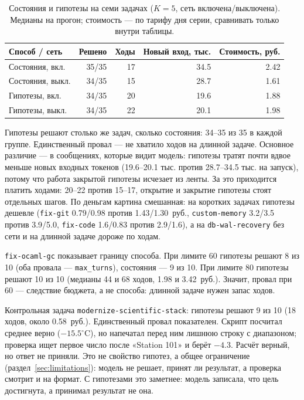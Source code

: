 \documentclass[11pt,a4paper]{article}
\begin{document}
\begin{table}[t]
\centering
\small
\caption{Состояния и гипотезы на семи задачах ($K=5$, сеть включена/выключена). Медианы на
прогон; стоимость --- по тарифу дня серии, сравнивать только внутри таблицы.}
\label{tab:hyp}
\begin{tabular}{@{}lrrrr@{}}
\toprule
Способ / сеть & Решено & Ходы & Новый вход, тыс. & Стоимость, руб. \\
\midrule
Состояния, вкл. & 35/35 & 17 & 34.5 & 2.42 \\
Состояния, выкл. & 34/35 & 15 & 28.7 & 1.61 \\
Гипотезы, вкл. & 34/35 & 20 & 19.6 & 1.88 \\
Гипотезы, выкл. & 34/35 & 22 & 20.1 & 1.98 \\
\bottomrule
\end{tabular}
\end{table}

Гипотезы решают столько же задач, сколько состояния: 34--35 из 35 в каждой группе.
Единственный провал --- не хватило ходов на длинной задаче. Основное различие --- в сообщениях,
которые видит модель: гипотезы тратят почти вдвое меньше новых входных токенов (19.6--20.1 тыс.
против 28.7--34.5 тыс. на запуск), потому что работа закрытой гипотезы исчезает из ленты. За это
приходится платить ходами: 20--22 против 15--17, открытие и закрытие гипотезы стоят отдельных
шагов. По деньгам картина смешанная: на коротких задачах гипотезы дешевле (\texttt{fix-git}
0.79/0.98 против 1.43/1.30~руб., \texttt{custom-memory} 3.2/3.5 против 3.9/5.0,
\texttt{fix-code} 1.6/0.83 против 2.9/1.6), а на \texttt{db-wal-recovery} без сети и на
длинной задаче дороже по ходам.

\texttt{fix-ocaml-gc} показывает границу способа. При лимите 60 гипотезы решают 8 из 10 (оба
провала --- \texttt{max\_turns}), состояния --- 9 из 10. При лимите 80 гипотезы решают 10 из
10 (медианы 44 и 68 ходов, 1.98 и 3.42~руб.). Значит, провал при 60 --- следствие бюджета, а
не способа: длинной задаче нужен запас ходов.

Контрольная задача \texttt{modernize-scientific-stack}: гипотезы решают 9 из 10 (18 ходов,
около 0.58~руб.). Единственный провал показателен. Скрипт посчитал среднее верно
($-15.5^\circ$C), но напечатал перед ним лишнюю строку с диапазоном; проверка ищет первое число
после «Station 101» и берёт $-4.3$. Расчёт верный, но ответ не приняли. Это не свойство
гипотез, а общее ограничение (раздел~\ref{sec:limitations}): модель не решает, принят ли
результат, а проверка смотрит и на формат. С гипотезами это заметнее: модель записала, что цель
достигнута, а принимал результат не она.
\end{document}
